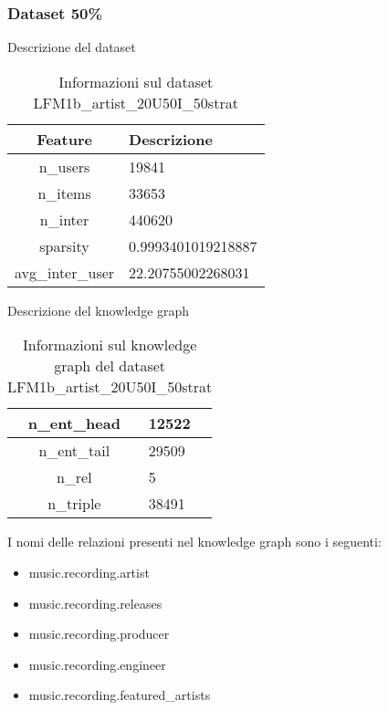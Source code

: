 \subsubsection{Dataset 50\%}

Descrizione del dataset
\begin{table}[H]
    \centering
    \footnotesize
    \begin{tabularx}{\textwidth}{|c|X|}
        \hline
        \textbf{Feature} & \textbf{Descrizione} \\
        \hline
        n\_users & 19841 \\
        \hline
        n\_items & 33653 \\
        \hline
        n\_inter & 440620 \\
        \hline
        sparsity &  0.9993401019218887 \\
        \hline
        avg\_inter\_user & 22.20755002268031 \\
        \hline
    \end{tabularx}
    \caption{Informazioni sul dataset LFM1b\_artist\_20U50I\_50strat}
    \label{tab:dataset_info}
\end{table}


\noindent Descrizione del knowledge graph
\begin{table}[H]
    \centering
    \footnotesize
    \begin{tabularx}{\textwidth}{|c|X|}
        \hline
        n\_ent\_head & 12522 \\
        \hline
        n\_ent\_tail & 29509 \\
        \hline
        n\_rel & 5 \\
        \hline
        n\_triple & 38491 \\
        \hline
    \end{tabularx}
    \caption{Informazioni sul knowledge graph del dataset LFM1b\_artist\_20U50I\_50strat}
    \label{tab:dataset_info}
\end{table}

\noindent I nomi delle relazioni presenti nel knowledge graph sono i seguenti:
\begin{itemize}
    \item music.recording.artist
    \item music.recording.releases
    \item music.recording.producer
    \item music.recording.engineer
    \item music.recording.featured\_artists
\end{itemize}



